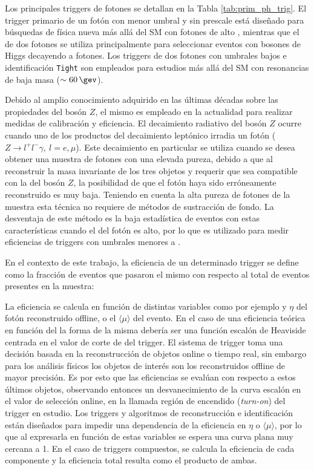 Los principales triggers de fotones se detallan en la Tabla \ref{tab:prim_ph_trig}. El trigger primario de un fotón con menor umbral y sin prescale 
está diseñado para búsquedas de física nueva más allá del SM con fotones de alto \ET, mientras que el de dos fotones se utiliza principalmente para seleccionar eventos con bosones de Higgs decayendo a fotones. Los triggers de dos fotones con umbrales bajos e identificación \texttt{Tight} son empleados para estudios más allá del SM con resonancias de baja masa ($\sim60\,\gev$).



Debido al amplio conocimiento adquirido en las últimas décadas sobre las propiedades del bosón $Z$, el mismo es empleado en la actualidad para realizar medidas de calibración y eficiencia. El decaimiento radiativo del bosón $Z$ ocurre cuando uno de los productos del decaimiento leptónico irradia un fotón ($Z\to l^{+}l^{-}\gamma,\:l=e,\mu$). Este decaimiento en particular se utiliza cuando se desea obtener una muestra de fotones con una elevada pureza, debido a que al reconstruir la masa invariante de los tres objetos y requerir que sea compatible con la del bosón $Z$, la posibilidad de que el fotón haya sido erróneamente reconstruido es muy baja. Teniendo en cuenta la alta pureza de fotones de la muestra esta técnica no requiere de métodos de sustracción de fondo. La desventaja de este método es la baja estadística de eventos con estas características cuando el \pt del fotón es alto, por lo que es utilizado para medir eficiencias de triggers con umbrales menores a .

En el contexto de este trabajo, la eficiencia de un determinado trigger se define como la fracción de eventos que pasaron el mismo con respecto al total de eventos presentes en la muestra:


La eficiencia se calcula en función de distintas variables como por ejemplo \ET y $\eta$ del fotón reconstruido offline, o el $\langle\mu\rangle$ del evento. En el caso de una eficiencia teórica en función del \ET la forma de la misma debería ser una función escalón de Heaviside centrada en el valor de corte de \ET del trigger. El sistema de trigger toma una decisión basada en la reconstrucción de objetos online o tiempo real, sin embargo para los análisis físicos los objetos de interés son los reconstruidos offline de mayor precisión. Es por esto que las eficiencias se evalúan con respecto a estos últimos objetos, observando entonces un desvanecimiento de la curva escalón en el valor de selección online, en la llamada región de encendido (\textit{turn-on}) del trigger en estudio. 
Los triggers y algoritmos de reconstrucción e identificación están diseñados para impedir una dependencia de la eficiencia en $\eta$ o $\langle\mu\rangle$, por lo que al expresarla en función de estas variables se espera una curva plana muy cercana a 1. En el caso de triggers compuestos, se calcula la eficiencia de cada componente y la eficiencia total resulta como el producto de ambas.



